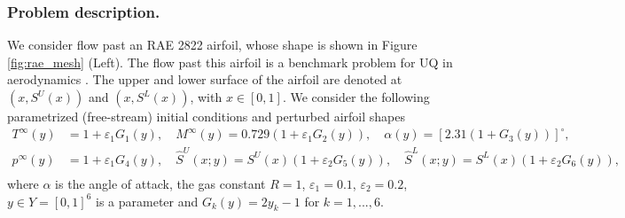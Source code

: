 \documentclass[a4paper]{article}
\numberwithin{equation}{section}
\numberwithin{equation}{section}
\theoremstyle{definition}
\theoremstyle{myremarkstyle}
\newcommand{\eps} {\varepsilon}
\begin{document}
\subsubsection{Problem description.}
We consider flow past an RAE 2822 airfoil, whose shape is shown in Figure \ref{fig:rae_mesh} (Left). The flow past this airfoil is a benchmark problem for UQ in aerodynamics \cite{UMRIDA}. The upper and lower surface of the airfoil are denoted at $(x,S^U(x))$ and $(x,S^L(x))$, with $x \in [0,1]$. We consider the following parametrized (free-stream) initial conditions and perturbed airfoil shapes
\begin{equation}
\label{eq:pert}
\begin{aligned}
T^\infty(y) &= 1 + \eps_1 G_1(y), \quad M^\infty(y) = 0.729(1 + \eps_1 G_2(y)), \quad \alpha(y)=[2.31(1+G_3(y))]^\circ,\\  
p^\infty(y) &= 1 + \eps_1 G_4(y), \quad \hat{S}^U(x;y) = S^U(x)(1+\eps_2G_5(y)), \quad \hat{S}^L(x;y) = S^L(x)(1+\eps_2G_6(y)),\\
\end{aligned}
\end{equation}
where $\alpha$ is the angle of attack, the gas constant $R=1$, $\eps_1 = 0.1$, $\eps_2 = 0.2$, $y \in Y = [0,1]^6$ is a parameter and $G_k(y) = 2y_k-1$ for $k=1,...,6$. 
\end{document}
